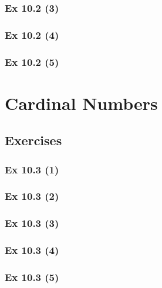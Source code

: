 \subsubsection{Ex 10.2 (3)}\label{sec:Ex_10.2.3}

\subsubsection{Ex 10.2 (4)}\label{sec:Ex_10.2.4}

\subsubsection{Ex 10.2 (5)}\label{sec:Ex_10.2.5}

\newpage		%

\section{Cardinal Numbers}\label{sec:10.3}
\subsection{Exercises}\label{sec:10.3_Exercises}

\subsubsection{Ex 10.3 (1)}\label{sec:Ex_10.3.1}

\subsubsection{Ex 10.3 (2)}\label{sec:Ex_10.3.2}

\subsubsection{Ex 10.3 (3)}\label{sec:Ex_10.3.3}

\subsubsection{Ex 10.3 (4)}\label{sec:Ex_10.3.4}

\subsubsection{Ex 10.3 (5)}\label{sec:Ex_10.3.5}

